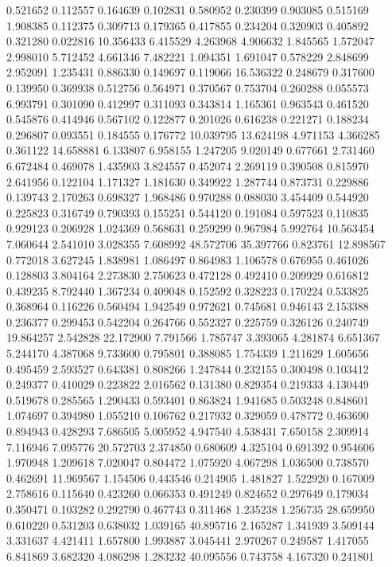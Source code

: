 0.521652
0.112557
0.164639
0.102831
0.580952
0.230399
0.903085
0.515169
1.908385
0.112375
0.309713
0.179365
0.417855
0.234204
0.320903
0.405892
0.321280
0.022816
10.356433
6.415529
4.263968
4.906632
1.845565
1.572047
2.998010
5.712452
4.661346
7.482221
1.094351
1.691047
0.578229
2.848699
2.952091
1.235431
0.886330
0.149697
0.119066
16.536322
0.248679
0.317600
0.139950
0.369938
0.512756
0.564971
0.370567
0.753704
0.260288
0.055573
6.993791
0.301090
0.412997
0.311093
0.343814
1.165361
0.963543
0.461520
0.545876
0.414946
0.567102
0.122877
0.201026
0.616238
0.221271
0.188234
0.296807
0.093551
0.184555
0.176772
10.039795
13.624198
4.971153
4.366285
0.361122
14.658881
6.133807
6.958155
1.247205
9.020149
0.677661
2.731460
6.672484
0.469078
1.435903
3.824557
0.452074
2.269119
0.390508
0.815970
2.641956
0.122104
1.171327
1.181630
0.349922
1.287744
0.873731
0.229886
0.139743
2.170263
0.698327
1.968486
0.970288
0.088030
3.454409
0.544920
0.225823
0.316749
0.790393
0.155251
0.544120
0.191084
0.597523
0.110835
0.929123
0.206928
1.024369
0.568631
0.259299
0.967984
5.992764
10.563454
7.060644
2.541010
3.028355
7.608992
48.572706
35.397766
0.823761
12.898567
0.772018
3.627245
1.838981
1.086497
0.864983
1.106578
0.676955
0.461026
0.128803
3.804164
2.273830
2.750623
0.472128
0.492410
0.209929
0.616812
0.439235
8.792440
1.367234
0.409048
0.152592
0.328223
0.170224
0.533825
0.368964
0.116226
0.560494
1.942549
0.972621
0.745681
0.946143
2.153388
0.236377
0.299453
0.542204
0.264766
0.552327
0.225759
0.326126
0.240749
19.864257
2.542828
22.172900
7.791566
1.785747
3.393065
4.281874
6.651367
5.244170
4.387068
9.733600
0.795801
0.388085
1.754339
1.211629
1.605656
0.495459
2.593527
0.643381
0.808266
1.247844
0.232155
0.300498
0.103412
0.249377
0.410029
0.223822
2.016562
0.131380
0.829354
0.219333
4.130449
0.519678
0.285565
1.290433
0.593401
0.863824
1.941685
0.503248
0.848601
1.074697
0.394980
1.055210
0.106762
0.217932
0.329059
0.478772
0.463690
0.894943
0.428293
7.686505
5.005952
4.947540
4.538431
7.650158
2.309914
7.116946
7.095776
20.572703
2.374850
0.680609
4.325104
0.691392
0.954606
1.970948
1.209618
7.020047
0.804472
1.075920
4.067298
1.036500
0.738570
0.462691
11.969567
1.154506
0.443546
0.214905
1.481827
1.522920
0.167009
2.758616
0.115640
0.423260
0.066353
0.491249
0.824652
0.297649
0.179034
0.350471
0.103282
0.292790
0.467743
0.311468
1.235238
1.256735
28.659950
0.610220
0.531203
0.638032
1.039165
40.895716
2.165287
1.341939
3.509144
3.331637
4.421411
1.657800
1.993887
3.045441
2.970267
0.249587
1.417055
6.841869
3.682320
4.086298
1.283232
40.095556
0.743758
4.167320
0.241801
